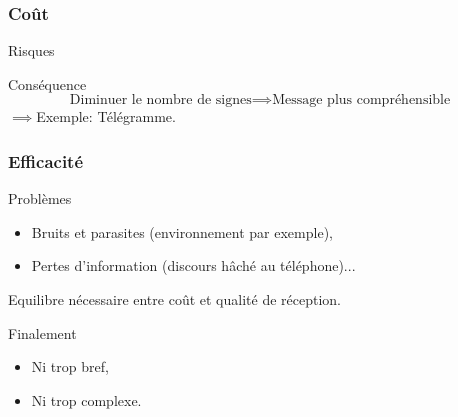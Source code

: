 \begin{frame}
	\frametitle{Coût}
	\begin{alertblock}{Risques}
		\centering
	\end{alertblock}
	\begin{exampleblock}{Conséquence}
		\[ \text{Diminuer le nombre de signes} \implies \text{Message plus compréhensible} \]
		$\implies$Exemple: Télégramme.
	\end{exampleblock}
\end{frame}
\begin{frame}
	\frametitle{Efficacité}
	\begin{alertblock}{Problèmes}
		\begin{itemize}
			\item Bruits et parasites (environnement par exemple),
			\item Pertes d'information (discours hâché au téléphone)...
		\end{itemize}
		Equilibre nécessaire entre coût et qualité de réception.
	\end{alertblock}
	\begin{block}{Finalement}
		\begin{itemize}
			\item Ni trop bref,
			\item Ni trop complexe.
		\end{itemize}
	\end{block}
\end{frame}
